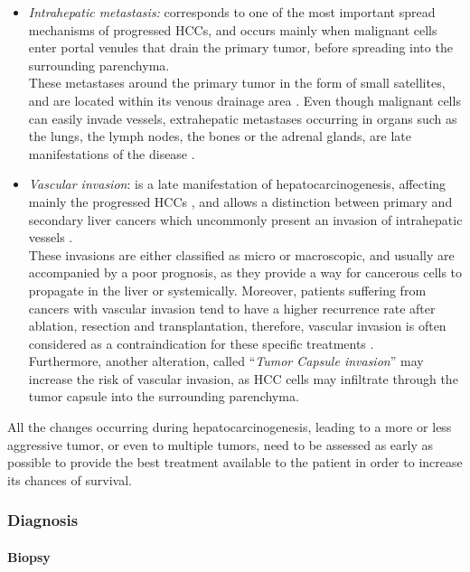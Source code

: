 \documentclass[]{article}
\let\oldparagraph\paragraph
\renewcommand{\paragraph}[1]{\oldparagraph{#1}\mbox{}}
\begin{document}
\begin{itemize}
\item \emph{Intrahepatic metastasis:} corresponds to one of the most
  important spread mechanisms of progressed HCCs, and occurs
  mainly when malignant cells enter portal venules that drain the
  primary tumor, before spreading into the surrounding parenchyma.\\
  These metastases around the primary tumor in the form of small
  satellites, and are located within its venous drainage area \cite{Nakashima2003}. Even though malignant cells can
  easily invade vessels, extrahepatic metastases occurring in organs
  such as the lungs, the lymph nodes, the bones or the adrenal glands,
  are late manifestations of the disease \cite{Theise2006, Trevisani2008a}.
\item \emph{Vascular invasion}: is a late manifestation of
  hepatocarcinogenesis, affecting mainly the progressed HCCs
  \cite{EdmondsonHA1954}, and allows a distinction between
  primary and secondary liver cancers which uncommonly present an
  invasion of intrahepatic vessels \cite{Okuda1997}.\\
  These invasions are either classified as micro or macroscopic, and
  usually are accompanied by a poor prognosis, as they provide a way for
  cancerous cells to propagate in the liver or systemically. Moreover,
  patients suffering from cancers with vascular invasion tend to have a
  higher recurrence rate after ablation, resection and transplantation,
  therefore, vascular invasion is often considered as a contraindication
  for these specific treatments \cite{Llovet2004}.\\
  Furthermore, another alteration, called ``\emph{Tumor Capsule
  invasion}'' may increase the risk of vascular invasion, as HCC
  cells may infiltrate through the tumor capsule into the surrounding
  parenchyma.
\end{itemize}

All the changes occurring during hepatocarcinogenesis, leading to a more
or less aggressive tumor, or even to multiple tumors, need to be
assessed as early as possible to provide the best treatment available to
the patient in order to increase its chances of survival.

\subsubsection*{Diagnosis}\label{diagnosis}

\paragraph{Biopsy}\label{biopsy}
\end{document}
